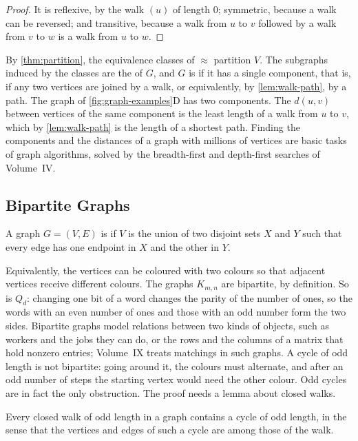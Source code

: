 \begin{proof}
It is reflexive, by the walk $(u)$ of length $0$; symmetric, because a walk can be reversed; and transitive, because a walk from $u$ to $v$ followed by a walk from $v$ to $w$ is a walk from $u$ to $w$.
\end{proof}

By \cref{thm:partition}, the equivalence classes of $\approx$ partition $V$. The subgraphs induced by the classes are the  of $G$, and $G$ is  if it has a single component, that is, if any two vertices are joined by a walk, or equivalently, by \cref{lem:walk-path}, by a path. The graph of \cref{fig:graph-examples}D has two components. The  $d(u,v)$ between vertices of the same component is the least length of a walk from $u$ to $v$, which by \cref{lem:walk-path} is the length of a shortest path. Finding the components and the distances of a graph with millions of vertices are basic tasks of graph algorithms, solved by the breadth-first and depth-first searches of Volume~IV.

\subsection{Bipartite Graphs}

\begin{definition}
\label{def:bipartite}
A graph $G=(V,E)$ is  if $V$ is the union of two disjoint sets $X$ and $Y$ such that every edge has one endpoint in $X$ and the other in $Y$.
\end{definition}

Equivalently, the vertices can be coloured with two colours so that adjacent vertices receive different colours. The graphs $K_{m,n}$ are bipartite, by definition. So is $Q_d$: changing one bit of a word changes the parity of the number of ones, so the words with an even number of ones and those with an odd number form the two sides. Bipartite graphs model relations between two kinds of objects, such as workers and the jobs they can do, or the rows and the columns of a matrix that hold nonzero entries; Volume~IX treats matchings in such graphs. A cycle of odd length is not bipartite: going around it, the colours must alternate, and after an odd number of steps the starting vertex would need the other colour. Odd cycles are in fact the only obstruction. The proof needs a lemma about closed walks.

\begin{lemma}
\label{lem:odd-walk}
Every closed walk of odd length in a graph contains a cycle of odd length, in the sense that the vertices and edges of such a cycle are among those of the walk.
\end{lemma}


